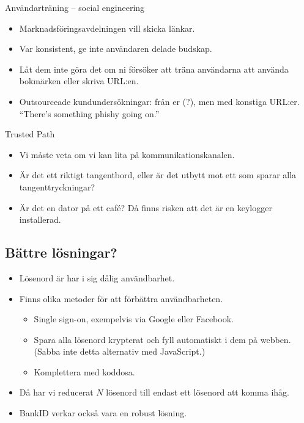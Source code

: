 \documentclass{beamer}
\begin{document}
\begin{frame}{\insertsubsectionhead}{Användarträning -- social engineering}
  \begin{itemize}
    \item Marknadsföringsavdelningen vill skicka länkar.
    \item Var konsistent, ge inte användaren delade budskap.
    \item Låt dem inte göra det om ni försöker att träna användarna att använda 
      bokmärken eller skriva URL:en.
    \item Outsourceade kundundersökningar: från er (?), men med konstiga 
      URL:er.
      \enquote{There's something phishy going on.}
  \end{itemize}
\end{frame}

\begin{frame}{\insertsubsectionhead}{Trusted Path}
  \begin{itemize}
    \item Vi måste veta om vi kan lita på kommunikationskanalen.
    \item Är det ett riktigt tangentbord, eller är det utbytt mot ett som 
      sparar alla tangenttryckningar?
    \item Är det en dator på ett café?
      Då finns risken att det är en keylogger installerad.
  \end{itemize}
\end{frame}

\subsection{Bättre lösningar?}

\begin{frame}{\insertsubsectionhead}
  \begin{itemize}
    \item Lösenord är har i sig dålig användbarhet.

    \item Finns olika metoder för att förbättra användbarheten.
      \begin{itemize}
        \item Single sign-on, exempelvis via Google eller Facebook.
        \item Spara alla lösenord krypterat och fyll automatiskt i dem på 
          webben.
          (Sabba inte detta alternativ med JavaScript.)
        \item Komplettera med koddosa.
      \end{itemize}

    \item Då har vi reducerat \(N\) lösenord till endast ett lösenord att komma 
      ihåg.

    \item BankID verkar också vara en robust lösning.

  \end{itemize}
\end{frame}
\end{document}
